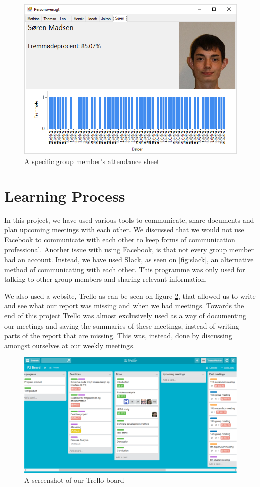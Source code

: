 \documentclass{article}
\begin{document}
\begin{figure}
	\centering
	\includegraphics[width=1\textwidth]{figures/soerenfravaer.png}
	\caption{A specific group member's attendance sheet}
	\label{fig:soerenfravaer}
\end{figure}

\section{Learning Process}
In this project, we have used various tools to communicate, share documents and plan upcoming meetings with each other. 
We discussed that we would not use Facebook to communicate with each other to keep forms of communication professional. Another issue with using Facebook, is that not every group member had an account.
Instead, we have used Slack, as seen on \ref{fig:slack}, an alternative method of communicating with each other. 
This programme was only used for talking to other group members and sharing relevant information.

We also used a website, Trello as can be seen on figure \ref{fig:trello}, that allowed us to write and see what our report was missing and when we had meetings. 
Towards the end of this project Trello was almost exclusively used as a way of documenting our meetings and saving the summaries of these meetings, instead of writing parts of the report that are missing. 
This was, instead, done by discussing amongst ourselves at our weekly meetings.
\begin{figure}
	\centering
	\includegraphics[width=1\textwidth]{figures/trello.png}
	\caption{A screenshot of our Trello board}
	\label{fig:trello}
\end{figure}
\end{document}
